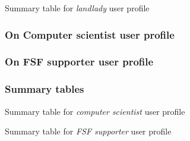\documentclass[10pt,a4paper]{article}
\begin{document}
    \begin{table}
      \begin{adjustwidth}{-2cm}{}
        
      \end{adjustwidth}
      \caption{Summary table for \emph{landlady} user profile}
      \label{fig:landlady-user-profile}
    \end{table}


    \subsubsection{On Computer scientist user profile}


    \subsubsection{On FSF supporter user profile}

    
    \subsubsection{Summary tables}

    \begin{table}
      \begin{adjustwidth}{-2cm}{}
            
      \end{adjustwidth}
      \caption{Summary table for \emph{computer scientist} user profile}
      \label{fig:computer-scientist-user-profile}
    \end{table}

    \begin{table}
      \begin{adjustwidth}{-2cm}{}
        
      \end{adjustwidth}
      \caption{Summary table for \emph{FSF supporter} user profile}
      \label{fig:FSF-supporter-user-profile}
    \end{table}




    
\end{document}
